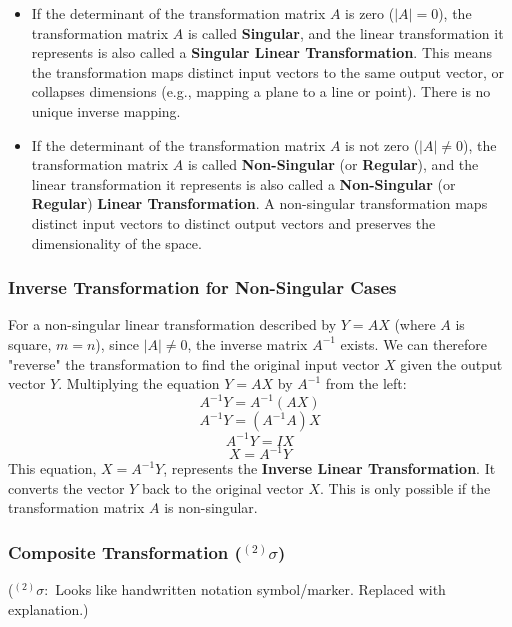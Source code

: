 \documentclass{article}
\begin{document}
\begin{itemize}
    \item If the determinant of the transformation matrix $A$ is zero ($|A| = 0$), the transformation matrix $A$ is called \textbf{Singular}, and the linear transformation it represents is also called a \textbf{Singular Linear Transformation}. This means the transformation maps distinct input vectors to the same output vector, or collapses dimensions (e.g., mapping a plane to a line or point). There is no unique inverse mapping.

    \item If the determinant of the transformation matrix $A$ is not zero ($|A| \neq 0$), the transformation matrix $A$ is called \textbf{Non-Singular} (or \textbf{Regular}), and the linear transformation it represents is also called a \textbf{Non-Singular} (or \textbf{Regular}) \textbf{Linear Transformation}. A non-singular transformation maps distinct input vectors to distinct output vectors and preserves the dimensionality of the space.

\end{itemize}

\subsubsection*{Inverse Transformation for Non-Singular Cases}

For a non-singular linear transformation described by $Y = AX$ (where $A$ is square, $m=n$), since $|A| \neq 0$, the inverse matrix $A^{-1}$ exists. We can therefore "reverse" the transformation to find the original input vector $X$ given the output vector $Y$. Multiplying the equation $Y = AX$ by $A^{-1}$ from the left:
\[ A^{-1} Y = A^{-1}(AX) \]
\[ A^{-1} Y = (A^{-1}A) X \]
\[ A^{-1} Y = I X \]
\[ X = A^{-1} Y \]
This equation, $X = A^{-1}Y$, represents the \textbf{Inverse Linear Transformation}. It converts the vector $Y$ back to the original vector $X$. This is only possible if the transformation matrix $A$ is non-singular.

\subsubsection*{Composite Transformation ($^{(2)}\sigma $)} ($^{(2)}\sigma :$ Looks like handwritten notation symbol/marker. Replaced with explanation.)
\end{document}
